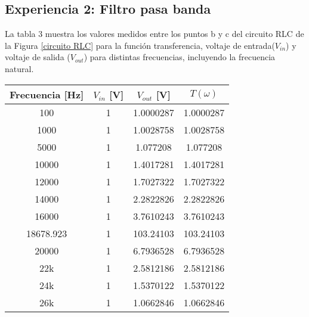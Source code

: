 \documentclass[letterpaper,11pt]{article} %
\begin{document}
\subsection{Experiencia 2: Filtro pasa banda}
La tabla 3 muestra los valores medidos entre los puntos b y c del circuito RLC de la Figura \ref{circuito RLC} para la función transferencia, voltaje de entrada($V_{in}$) y voltaje de salida ($V_{out}$) para distintas frecuencias, incluyendo la frecuencia natural.
\begin{center}
\begin{tabular}{|c|c|c|c|}
\hline
\textbf{Frecuencia {[}Hz{]}} & \textbf{$V_{in}$ {[}V{]}} & \textbf{$V_{out}$ {[}V{]}} & \textbf{$T(\omega)$} \\ \hline
100                          & 1                         & 1.0000287                  & 1.0000287            \\ \hline
1000                         & 1                         & 1.0028758                  & 1.0028758            \\ \hline
5000                         & 1                         & 1.077208                   & 1.077208             \\ \hline
10000                        & 1                         & 1.4017281                  & 1.4017281            \\ \hline
12000                        & 1                         & 1.7027322                  & 1.7027322            \\ \hline
14000                        & 1                         & 2.2822826                  & 2.2822826            \\ \hline
16000                        & 1                         & 3.7610243                  & 3.7610243            \\ \hline
18678.923                    & 1                         & 103.24103                  & 103.24103            \\ \hline
20000                        & 1                         & 6.7936528                  & 6.7936528            \\ \hline
22k                          & 1                         & 2.5812186                  & 2.5812186            \\ \hline
24k                          & 1                         & 1.5370122                  & 1.5370122            \\ \hline
26k                          & 1                         & 1.0662846                  & 1.0662846            \\ \hline

\end{tabular}
\end{center}
\end{document}

